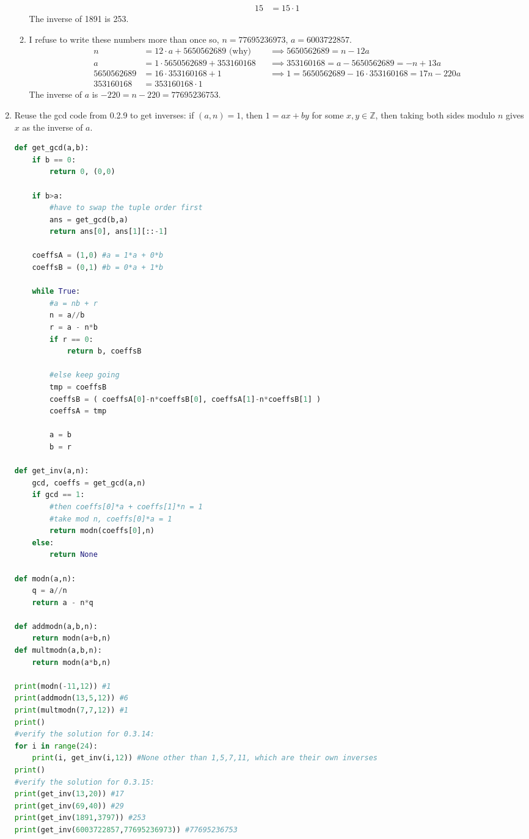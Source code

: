 \documentclass[]{article}
\newcommand{\bbz}{\mathbb{Z}}
\begin{document}
\begin{enumerate}
\begin{enumerate}
\begin{align}
15 &= 15\cdot 1
\end{align}
The inverse of 1891 is 253.
\item I refuse to write these numbers more than once so, $n = 77695236973$, $a = 6003722857$.
\begin{align}
n &= 12\cdot a + 5650562689 \text{\ (why)} &&\implies 5650562689 = n - 12a \\
a &= 1\cdot 5650562689 + 353160168 &&\implies 353160168 = a - 5650562689 = -n + 13a \\
5650562689 &= 16\cdot 353160168 + 1 &&\implies 1 = 5650562689 - 16\cdot 353160168 = 17n - 220a \\
353160168 &= 353160168 \cdot 1
\end{align}
The inverse of $a$ is $-220 = n-220 = 77695236753$.
\end{enumerate}
\item Reuse the gcd code from 0.2.9 to get inverses: if $(a,n) = 1$, then $1 = ax + by$ for some $x,y\in\bbz$, then taking both sides modulo $n$ gives $x$ as the inverse of $a$.
\begin{lstlisting}[language=Python]
def get_gcd(a,b):
    if b == 0:
        return 0, (0,0)

    if b>a:
        #have to swap the tuple order first
        ans = get_gcd(b,a)
        return ans[0], ans[1][::-1]

    coeffsA = (1,0) #a = 1*a + 0*b
    coeffsB = (0,1) #b = 0*a + 1*b

    while True:
        #a = nb + r
        n = a//b
        r = a - n*b
        if r == 0:
            return b, coeffsB

        #else keep going
        tmp = coeffsB
        coeffsB = ( coeffsA[0]-n*coeffsB[0], coeffsA[1]-n*coeffsB[1] )
        coeffsA = tmp

        a = b
        b = r

def get_inv(a,n):
    gcd, coeffs = get_gcd(a,n)
    if gcd == 1:
        #then coeffs[0]*a + coeffs[1]*n = 1
        #take mod n, coeffs[0]*a = 1
        return modn(coeffs[0],n)
    else:
        return None

def modn(a,n):
    q = a//n
    return a - n*q

def addmodn(a,b,n):
    return modn(a+b,n)
def multmodn(a,b,n):
    return modn(a*b,n)

print(modn(-11,12)) #1
print(addmodn(13,5,12)) #6
print(multmodn(7,7,12)) #1
print()
#verify the solution for 0.3.14:
for i in range(24):
    print(i, get_inv(i,12)) #None other than 1,5,7,11, which are their own inverses
print()
#verify the solution for 0.3.15:
print(get_inv(13,20)) #17
print(get_inv(69,40)) #29
print(get_inv(1891,3797)) #253
print(get_inv(6003722857,77695236973)) #77695236753
\end{lstlisting}
\end{enumerate}
\end{document}
